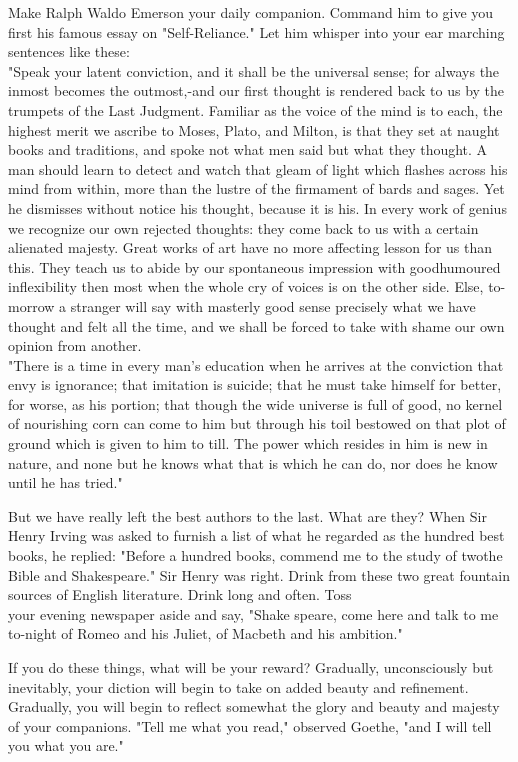 \documentclass[10pt]{article}
\begin{document}
Make Ralph Waldo Emerson your daily companion. Command him to give you first his famous essay on "Self-Reliance." Let him whisper into your ear marching sentences like these:\\
"Speak your latent conviction, and it shall be the universal sense; for always the inmost becomes the outmost,-and our first thought is rendered back to us by the trumpets of the Last Judgment. Familiar as the voice of the mind is to each, the highest merit we ascribe to Moses, Plato, and Milton, is that they set at naught books and traditions, and spoke not what men said but what they thought. A man should learn to detect and watch that gleam of light which flashes across his mind from within, more than the lustre of the firmament of bards and sages. Yet he dismisses without notice his thought, because it is his. In every work of genius we recognize our own rejected thoughts: they come back to us with a certain alienated majesty. Great works of art have no more affecting lesson for us than this. They teach us to abide by our spontaneous impression with goodhumoured inflexibility then most when the whole cry of voices is on the other side. Else, to-morrow a stranger will say with masterly good sense precisely what we have thought and felt all the time, and we shall be forced to take with shame our own opinion from another.\\
"There is a time in every man's education when he arrives at the conviction that envy is ignorance; that imitation is suicide; that he must take himself for better, for worse, as his portion; that though the wide universe is full of good, no kernel of nourishing corn can come to him but through his toil bestowed on that plot of ground which is given to him to till. The power which resides in him is new in nature, and none but he knows what that is which he can do, nor does he know until he has tried."

But we have really left the best authors to the last. What are they? When Sir Henry Irving was asked to furnish a list of what he regarded as the hundred best books, he replied: "Before a hundred books, commend me to the study of twothe Bible and Shakespeare." Sir Henry was right. Drink from these two great fountain sources of English literature. Drink long and often. Toss\\
your evening newspaper aside and say, "Shake speare, come here and talk to me to-night of Romeo and his Juliet, of Macbeth and his ambition."

If you do these things, what will be your reward? Gradually, unconsciously but inevitably, your diction will begin to take on added beauty and refinement. Gradually, you will begin to reflect somewhat the glory and beauty and majesty of your companions. "Tell me what you read," observed Goethe, "and I will tell you what you are."
\end{document}
